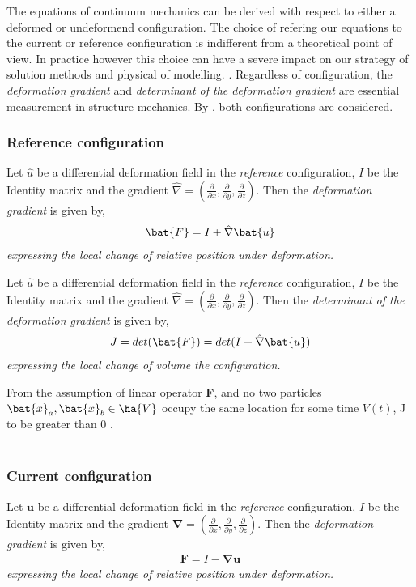 The equations of continuum mechanics can be derived with respect to either a deformed or undeformend configuration. The choice of refering our equations to the current or reference configuration is indifferent from a theoretical point of view. In practice however this choice can have a severe impact on our strategy of solution methods and physical of modelling.   \cite{Wriggers2006}. Regardless of configuration, the \textit{deformation gradient} and \textit{determinant of the deformation gradient} are essential measurement in structure mechanics. 
By \cite{Richter2016}, both configurations are considered.


\subsubsection*{Reference configuration}
\begin{defn}
Let $\hat{u}$ be a differential deformation field in the \textit{reference} configuration, $I$ be the Identity matrix and
the gradient $\hat{\nabla} = (\frac{\partial}{\partial x}, \frac{\partial}{\partial y}, \frac{\partial}{\partial z}) $. Then the \textit{deformation gradient} is given by,
\begin{align}
\bat{F} = I + \hat{\nabla} \bat{u} 
\end{align} 
\textit{expressing the local change of relative position under deformation.}
\end{defn}

\begin{defn}
Let $\hat{u}$ be a differential deformation field in the \textit{reference} configuration, $I$ be the Identity matrix and
the gradient $\hat{\nabla} = (\frac{\partial}{\partial x}, \frac{\partial}{\partial y}, \frac{\partial}{\partial z}) $. Then the \textit{determinant of the deformation gradient} is given by,
\begin{align}
J = det(\bat{F}) = det( I + \hat{\nabla} \bat{u} )
\end{align} 
\textit{expressing the local change of volume the configuration.}
\end{defn}

From the assumption of linear operator \textbf{F}, and no two particles $\bat{x}_a, \bat{x}_b \in \ha{V}$ occupy the same location for some time $V(t)$,  J to be greater than 0 \cite{Wriggers2006}. \\ \\

\subsubsection*{Current configuration}
\begin{defn}
Let $\mathbf{u}$ be a differential deformation field in the \textit{reference} configuration, $I$ be the Identity matrix and
the gradient $\mathbf{\nabla} = (\frac{\partial}{\partial x}, \frac{\partial}{\partial y}, \frac{\partial}{\partial z}) $. Then the \textit{deformation gradient} is given by,
\begin{align}
\mathbf{F} = I - \mathbf{\nabla} \mathbf{u} 
\end{align} 
\textit{expressing the local change of relative position under deformation.}
\end{defn}

